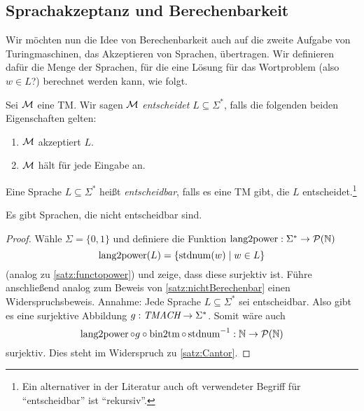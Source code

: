 \subsection{Sprachakzeptanz und Berechenbarkeit}
Wir möchten nun die Idee von Berechenbarkeit auch auf die zweite Aufgabe von Turingmaschinen, das Akzeptieren von Sprachen, übertragen.
Wir definieren dafür die Menge der Sprachen, für die eine Lösung für das Wortproblem (also $w\in L$?) berechnet werden kann, wie folgt.

\begin{Def}[name={[Entscheidbarkeit]}]
	Sei $\mathcal{M}$ eine \ac{TM}.
	Wir sagen $\mathcal{M}$ \emph{entscheidet} $L\subseteq\Sigma^*$, falls die folgenden beiden Eigenschaften gelten:
	\begin{enumerate}
	\item $\mathcal{M}$ akzeptiert $L$.
	\item $\mathcal{M}$ hält für jede Eingabe an.
	\end{enumerate}
	
    Eine Sprache $L\subseteq\Sigma^*$ heißt \emph{entscheidbar}, falls es eine \ac{TM} gibt, die $L$ entscheidet.\footnote{
    Ein alternativer in der Literatur auch oft verwendeter Begriff für "`entscheidbar"' ist "`rekursiv"'.}
\end{Def}


\begin{Satz}\label{satz:NichtEntscheidbareSprache}
 Es gibt Sprachen, die nicht entscheidbar sind.
\end{Satz}

\begin{proof}
Wähle $\Sigma=\{0,1\}$ 
und definiere die Funktion \mbox{$\operatorname{lang2power}:\Sigma^*\rightarrow \mathcal{P}(\mathbb{N})$}
$$\operatorname{lang2power}(L)=\{\operatorname{stdnum}(w) \mid w\in L\}$$
(analog zu \autoref{satz:functopower}) und zeige, dass diese surjektiv ist.
Führe anschließend analog zum Beweis von \autoref{satz:nichtBerechenbar} einen Widerspruchsbeweis.
Annahme: Jede Sprache $L\subseteq\Sigma^*$ sei entscheidbar. Also gibt es eine surjektive Abbildung $g:\textit{TMACH}\rightarrow\Sigma^*$.
Somit wäre auch 
$$\operatorname{lang2power}\circ g \circ\operatorname{bin2tm}\circ \operatorname{stdnum}^{-1}:\mathbb{N}\rightarrow\mathcal{P}(\mathbb{N})$$
surjektiv.
Dies steht im Widerspruch zu \autoref{satz:Cantor}.
\end{proof}


